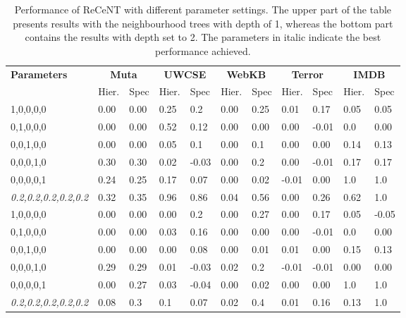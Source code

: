 \begin{table*}[t]
\begin{center}
\footnotesize

\caption{Performance of ReCeNT with different parameter settings. The upper part of the table presents results with the neighbourhood trees with depth of 1, whereas the bottom part contains the results with depth set to 2. The parameters in italic indicate the best performance achieved.}

\begin{tabular}[t]{|p{2cm}|p{0.5cm}|p{0.5cm}|p{0.5cm}|p{0.6cm}|p{0.5cm}|p{0.5cm}|p{0.6cm}|p{0.6cm}|p{0.5cm}|p{0.6cm}|}
	\hline
	\multirow{2}{*}{\textbf{Parameters}} & \multicolumn{2}{|c|}{\textbf{Muta}} & \multicolumn{2}{|c|}{\textbf{UWCSE}} & \multicolumn{2}{|c|}{\textbf{WebKB}} & \multicolumn{2}{|c|}{\textbf{Terror}}  & \multicolumn{2}{|c|}{\textbf{IMDB}} \\
	                     &  Hier. & Spec    & Hier. & Spec & Hier.  & Spec  & Hier.  & Spec   & Hier.  & Spec   \\
	\hline
	1,0,0,0,0   &  0.00	   &   0.00		 		& 0.25 & 0.2     		& 0.00  & 0.25       & 0.01 & 0.17 		& 0.05 & 0.05   \\
	\hline
	0,1,0,0,0 &  	0.00  &  0.00     	 		& 0.52 & 0.12   		& 0.00  & 0.00     	  & 0.00 & -0.01		& 0.0 & 0.00  \\	
	\hline	
	0,0,1,0,0  &  	0.00  &  0.00	      		& 0.05 & 0.1  	  		& 0.00 & 0.1         & 0.00 & 0.00  		& 0.14 & 0.13  \\	
	\hline
	0,0,0,1,0  & 0.30  &  0.30    				& 0.02 & -0.03 	   		& 0.00 & 0.2         & 0.00 & -0.01 		& 0.17 & 0.17  \\  
	\hline	
	0,0,0,0,1  &    0.24  & 0.25				& 0.17 &  0.07     		& 0.00 & 0.02  		  & -0.01 & 0.00  		& 1.0 &   1.0   \\
	\hline
	\textit{0.2,0.2,0.2,0.2,0.2} & 0.32 & 0.35 &0.96 &  0.86   		& 0.04 & 0.56 		  & 0.00 & 0.26 		& 0.62 & 1.0  \\
	\hline
	\hline
	1,0,0,0,0  &  	0.00   & 0.00	 			& 0.00 & 0.2   			& 0.00 & 0.27 		  & 0.00 & 0.17  		& 0.05 & -0.05   \\
	\hline
	0,1,0,0,0 &  	0.00  & 0.00	 			& 0.03 & 0.16 			& 0.00	& 0.00 		  & 0.00 & -0.01 		& 0.0 & 0.00  \\	
	\hline	
	0,0,1,0,0  &  	0.00 &  0.00  				& 0.00 & 0.08  	  		& 0.00 & 0.01      	  & 0.01 & 0.00 		& 0.15 & 0.13  \\	
	\hline
	0,0,0,1,0  &  	0.29 &  0.29   				& 0.01 & -0.03			& 0.02  & 0.2 	  	  & -0.01 & -0.01		& 0.00 & 0.00  \\  
	\hline	
	0,0,0,0,1  &   0.00 & 0.27     			    & 0.03 	& -0.04			& 0.00 & 0.02  		  & 0.00 &  0.00		& 1.0 &  1.0    \\
	\hline
	\textit{0.2,0.2,0.2,0.2,0.2} & 0.08 & 0.3  & 0.1	&  0.07  	    &  0.02&  0.4 		  & 0.01 & 0.16 		& 0.13 & 1.0 \\
	\hline		
	

\end{tabular}
\end{center}
\end{table*}
